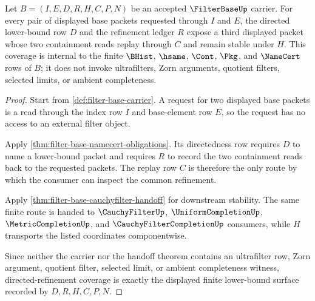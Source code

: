 \begin{theorem}
\label{thm:filter-base-directed-refinement-coverage}
Let $B=(I,E,D,R,H,C,P,N)$ be an accepted $\FilterBaseUp$ carrier. For every pair of displayed base packets requested through $I$ and $E$, the directed lower-bound row $D$ and the refinement ledger $R$ expose a third displayed packet whose two containment reads replay through $C$ and remain stable under $H$. This coverage is internal to the finite $\BHist$, $\hsame$, $\Cont$, $\Pkg$, and $\NameCert$ rows of $B$; it does not invoke ultrafilters, Zorn arguments, quotient filters, selected limits, or ambient completeness.
\end{theorem}
\begin{proof}
Start from \autoref{def:filter-base-carrier}. A request for two displayed base packets is a read through the index row $I$ and base-element row $E$, so the request has no access to an external filter object.

Apply \autoref{thm:filter-base-namecert-obligations}. Its directedness row requires $D$ to name a lower-bound packet and requires $R$ to record the two containment reads back to the requested packets. The replay row $C$ is therefore the only route by which the consumer can inspect the common refinement.

Apply \autoref{thm:filter-base-cauchyfilter-handoff} for downstream stability. The same finite route is handed to $\CauchyFilterUp$, $\UniformCompletionUp$, $\MetricCompletionUp$, and $\CauchyFilterCompletionUp$ consumers, while $H$ transports the listed coordinates componentwise.

Since neither the carrier nor the handoff theorem contains an ultrafilter row, Zorn argument, quotient filter, selected limit, or ambient completeness witness, directed-refinement coverage is exactly the displayed finite lower-bound surface recorded by $D,R,H,C,P,N$.
\end{proof}

